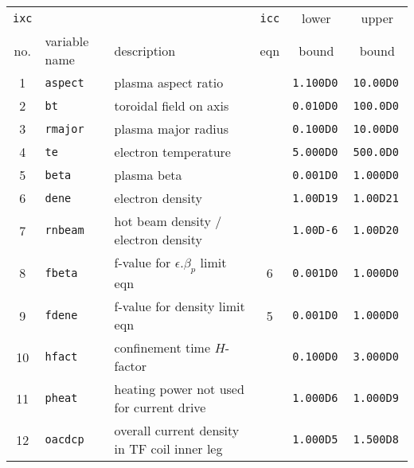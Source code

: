 
\begin{table}[tbph]
\footnotesize
\begin{center}

\begin{tabular}{||c|l|l|c|c|c||} \hline
{\tt ixc} &           &                                                         & {\tt icc} & lower        & upper       \\
no. & variable name   & description                                             & eqn       & bound        & bound       \\ \hline
1   & \tt aspect      & plasma aspect ratio                                     &           & \tt 1.100D0  & \tt 10.00D0 \\
2   & \tt bt          & toroidal field on axis                                  &           & \tt 0.010D0  & \tt 100.0D0 \\
3   & \tt rmajor      & plasma major radius                                     &           & \tt 0.100D0  & \tt 10.00D0 \\
4   & \tt te          & electron temperature                                    &           & \tt 5.000D0  & \tt 500.0D0 \\
5   & \tt beta        & plasma beta                                             &           & \tt 0.001D0  & \tt 1.000D0 \\
6   & \tt dene        & electron density                                        &           & \tt 1.00D19  & \tt 1.00D21 \\
7   & \tt rnbeam      & hot beam density / electron density                     &           & \tt 1.00D-6  & \tt 1.00D20 \\
8   & \tt fbeta       & f-value for $\epsilon.\beta_p$ limit eqn                & 6         & \tt 0.001D0  & \tt 1.000D0 \\
9   & \tt fdene       & f-value for density limit eqn                           & 5         & \tt 0.001D0  & \tt 1.000D0 \\
10  & \tt hfact       & confinement time $H$-factor                             &           & \tt 0.100D0  & \tt 3.000D0 \\
11  & \tt pheat       & heating power not used for current drive                &           & \tt 1.000D6  & \tt 1.000D9 \\
12  & \tt oacdcp      & overall current density in TF coil inner leg            &           & \tt 1.000D5  & \tt 1.500D8 \\

\end{tabular}
\end{center}
\end{table}
